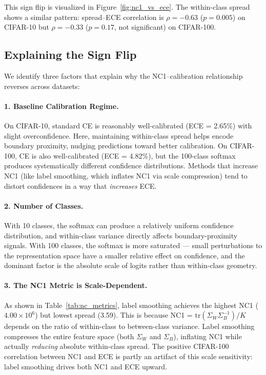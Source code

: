 \documentclass{article}
\begin{document}
This sign flip is visualized in Figure~\ref{fig:nc1_vs_ece}. The within-class spread shows a similar pattern: spread--ECE correlation is $\rho = -0.63$ ($p = 0.005$) on CIFAR-10 but $\rho = -0.33$ ($p = 0.17$, not significant) on CIFAR-100.

\subsection{Explaining the Sign Flip}

We identify three factors that explain why the NC1--calibration relationship reverses across datasets:

\paragraph{1. Baseline Calibration Regime.}
On CIFAR-10, standard CE is reasonably well-calibrated (ECE = 2.65\%) with slight overconfidence. Here, maintaining within-class spread helps encode boundary proximity, nudging predictions toward better calibration. On CIFAR-100, CE is also well-calibrated (ECE = 4.82\%), but the 100-class softmax produces systematically different confidence distributions. Methods that increase NC1 (like label smoothing, which inflates NC1 via scale compression) tend to distort confidences in a way that \emph{increases} ECE.

\paragraph{2. Number of Classes.}
With 10 classes, the softmax can produce a relatively uniform confidence distribution, and within-class variance directly affects boundary-proximity signals. With 100 classes, the softmax is more saturated --- small perturbations to the representation space have a smaller relative effect on confidence, and the dominant factor is the absolute scale of logits rather than within-class geometry.

\paragraph{3. The NC1 Metric is Scale-Dependent.}
As shown in Table~\ref{tab:nc_metrics}, label smoothing achieves the highest NC1 ($4.00 \times 10^6$) but lowest spread (3.59). This is because NC1 = $\text{tr}(\Sigma_W \Sigma_B^{-1})/K$ depends on the ratio of within-class to between-class variance. Label smoothing compresses the entire feature space (both $\Sigma_W$ and $\Sigma_B$), inflating NC1 while actually \emph{reducing} absolute within-class spread. The positive CIFAR-100 correlation between NC1 and ECE is partly an artifact of this scale sensitivity: label smoothing drives both NC1 and ECE upward.
\end{document}
